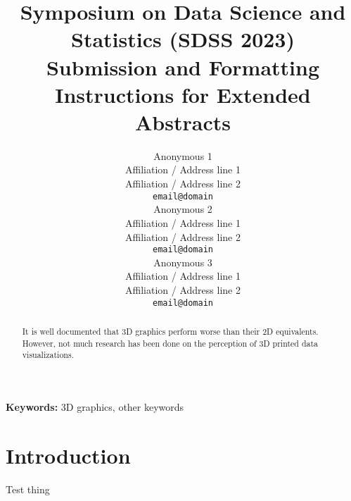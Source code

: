 \documentclass[10pt]{article}
\title{Symposium on Data Science and Statistics (SDSS 2023) \\
Submission and Formatting Instructions for Extended Abstracts}
\author{
  Anonymous 1 \\
  Affiliation / Address line 1 \\
  Affiliation / Address line 2 \\
  {\tt email@domain} \\\And
 Anonymous 2 \\
  Affiliation / Address line 1 \\
  Affiliation / Address line 2 \\
  {\tt email@domain} \\\And
  Anonymous 3 \\
  Affiliation / Address line 1 \\
  Affiliation / Address line 2 \\
  {\tt email@domain} \\}
\date{}
\begin{document}
\maketitle
\begin{abstract}
  It is well documented that 3D graphics perform worse than their 2D equivalents.
  However, not much research has been done on the perception of 3D printed data visualizations.
\end{abstract}

{\bf Keywords:} 3D graphics, other keywords

\section{Introduction}


Test thing




\end{document}
